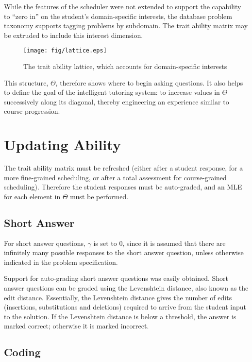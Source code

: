 While the features of the scheduler were not extended to support the capability
to ``zero in'' on the student's domain-specific interests, the database problem
taxonomy supports tagging problems by subdomain.  The trait ability matrix may
be extruded to include this interest dimension.

\begin{figure}[p!]
 \label{fig:lattice}
 \texttt{[image: fig/lattice.eps]} 
 \caption{The trait ability lattice, which accounts for domain-specific 
  interests}
\end{figure}

This structure, $\Theta$, therefore shows where to begin asking questions.  It
also helps to define the goal of the intelligent tutoring system: to increase
values in $\Theta$ successively along its diagonal, thereby engineering an
experience similar to course progression.

\section{Updating Ability}

The trait ability matrix must be refreshed (either after a student response,
for a more fine-grained scheduling, or after a total assessment for
course-grained scheduling).  Therefore the student responses must be
auto-graded, and an MLE for each element in $\Theta$ must be performed.

\subsection{Short Answer}

For short answer questions, $\gamma$ is set to 0, since it is assumed that
there are infinitely many possible responses to the short answer question,
unless otherwise indicated in the problem specification. 

Support for auto-grading short answer questions was easily obtained.  Short
answer questions can be graded using the Levenshtein distance, also known as
the edit distance.  Essentially, the Levenshtein distance gives the number of
edits (insertions, substitutions and deletions) required to arrive from the
student input to the solution.  If the Levenshtein distance is below a
threshold, the answer is marked correct; otherwise it is marked incorrect. 

\subsection{Coding}

